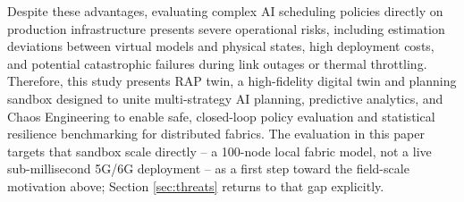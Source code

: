 \documentclass[twoside,twocolumn,10pt]{article}
\begin{document}
Despite these advantages, evaluating complex AI scheduling policies directly on production infrastructure presents severe operational risks, including estimation deviations between virtual models and physical states, high deployment costs, and potential catastrophic failures during link outages or thermal throttling.
Therefore, this study presents RAP twin, a high-fidelity digital twin and planning sandbox designed to unite multi-strategy AI planning, predictive analytics, and Chaos Engineering to enable safe, closed-loop policy evaluation and statistical resilience benchmarking for distributed fabrics. The evaluation in this paper targets that sandbox scale directly -- a 100-node local fabric model, not a live sub-millisecond 5G/6G deployment -- as a first step toward the field-scale motivation above; Section \ref{sec:threats} returns to that gap explicitly.
\end{document}
